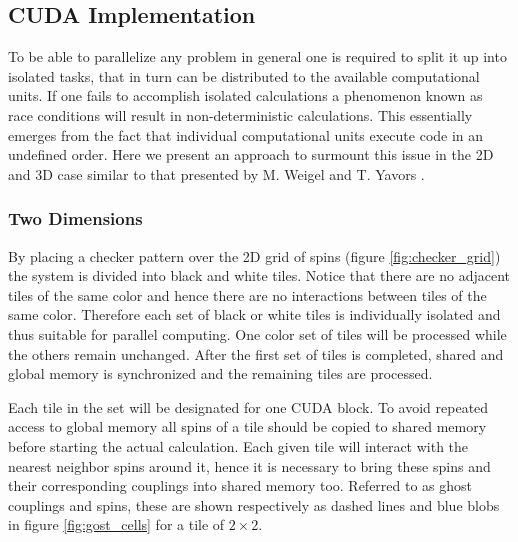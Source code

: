 \documentclass[paper=a4, fontsize=11pt]{scrartcl} %
\numberwithin{equation}{section} %
\numberwithin{figure}{section} %
\numberwithin{table}{section} %
\begin{document}
\subsection{CUDA Implementation}
To be able to parallelize any problem in general one is required to split it up into isolated tasks, that in turn can be distributed to the available computational units. If one fails to accomplish isolated calculations a phenomenon known as race conditions will result in non-deterministic calculations. This essentially emerges from the fact that individual computational units execute code in an undefined order. Here we present an approach to surmount this issue in the 2D and 3D case similar to that presented by M. Weigel and T. Yavors \cite{gpu_mc_spins}.

\subsubsection{Two Dimensions}
By placing a checker pattern over the 2D grid of spins (figure \ref{fig:checker_grid}) the system is divided into black and white tiles. Notice that there are no adjacent tiles of the same color and hence there are no interactions between tiles of the same color. Therefore each set of black or white tiles is individually isolated and thus suitable for parallel computing. One color set of tiles will be processed while the others remain unchanged. After the first set of tiles is completed, shared and global memory is synchronized and the remaining tiles are processed.

Each tile in the set will be designated for one CUDA block. To avoid repeated access to global memory all spins of a tile should be copied to shared memory before starting the actual calculation. Each given tile will interact with the nearest neighbor spins around it, hence it is necessary to bring these spins and their corresponding couplings into shared memory too. Referred to as ghost couplings and spins, these are shown respectively as dashed lines and blue blobs in figure \ref{fig:gost_cells} for a tile of $2\times2$.
\end{document}
